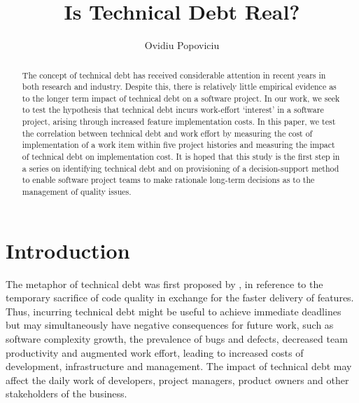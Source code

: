 \documentclass{mpaper}
\begin{document}
\title{Is Technical Debt Real?}
\author{Ovidiu Popoviciu}


\maketitle


\begin{abstract}
The concept of technical debt has received considerable attention in recent
years in both research and industry. Despite this, there is relatively little
empirical evidence as to the longer term impact of technical debt on a software
project. In our work, we seek to test the hypothesis that technical debt incurs
work-effort `interest' in a software project, arising through increased feature
implementation costs. In this paper, we test the correlation between technical
debt and work effort by measuring the cost of implementation of a work item
within five project histories and measuring the impact of technical debt on
implementation cost. It is hoped that this study is the first step in a series
on identifying technical debt and on provisioning of a decision-support method
to enable software project teams to make rationale long-term decisions as to the
management of quality issues. 
\end{abstract}

\section{Introduction}
\label{introduction}

The metaphor of technical debt was first proposed by \cite{Cunningham1993}, in
reference to the temporary sacrifice of code quality in exchange for the faster
delivery of features. Thus, incurring technical debt might be useful to achieve
immediate deadlines but may simultaneously have negative consequences for future
work, such as software complexity growth, the prevalence of bugs and defects,
decreased team productivity and augmented work effort, leading to increased
costs of development, infrastructure and management. The impact of technical
debt may affect the daily work of developers, project managers, product owners
and other stakeholders of the business.
\end{document}
